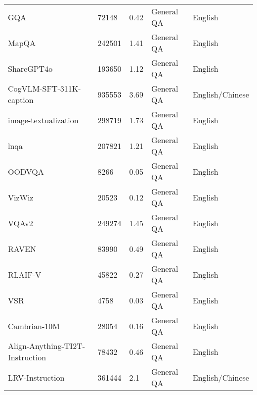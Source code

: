\begin{table}[ht]
\begin{tabular}{l|l|l|l|l}
GQA~\cite{hudson2019gqa}                           & 72148  & 0.42       & General QA   & English         \\
MapQA~\cite{chang2022mapqa}                        & 242501 & 1.41       & General QA   & English         \\
ShareGPT4o~\cite{internvl_2024}                   & 193650 & 1.12       & General QA   & English         \\
CogVLM-SFT-311K-caption~\cite{wang2023cogvlm}      & 935553 & 3.69       & General QA   & English/Chinese \\
image-textualization~\cite{pi2024image}            & 298719 & 1.73       & General QA   & English         \\
lnqa~\cite{2020Connecting}                         & 207821 & 1.21       & General QA   & English         \\
OODVQA~\cite{0Benchmarking}                        & 8266   & 0.05       & General QA   & English         \\
VizWiz~\cite{2018VizWiz}                           & 20523  & 0.12       & General QA   & English         \\
VQAv2~\cite{goyal2017making}                       & 249274 & 1.45       & General QA   & English         \\
RAVEN~\cite{zhang2019raven}                        & 83990  & 0.49       & General QA   & English         \\
RLAIF-V~\cite{yu2024rlaifv}                        & 45822  & 0.27       & General QA   & English         \\
VSR~\cite{Liu2022VisualSR}                         & 4758   & 0.03       & General QA   & English         \\
Cambrian-10M~\cite{tong2024cambrian1}              & 28054  & 0.16       & General QA   & English         \\
Align-Anything-TI2T-Instruction~\cite{ji2024align} & 78432  & 0.46       & General QA   & English         \\
LRV-Instruction~\cite{liu2023aligning}             & 361444 & 2.1        & General QA   & English/Chinese \\

\end{tabular}
\end{table}
